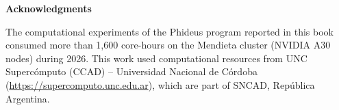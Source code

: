 \clearpage
\thispagestyle{empty}
\vspace*{0.24\textheight}

\begin{center}
\begin{minipage}{0.7\textwidth}
\setlength{\parindent}{0pt}
\setlength{\parskip}{0.95em}
\raggedright

{\Large\bfseries Acknowledgments\par}
\vspace{0.4em}
\frontcutdivider[0.09\textwidth]

\vspace{1.2em}

The computational experiments of the Phideus program reported in this book consumed more than 1,600 core-hours on the Mendieta cluster (NVIDIA A30 nodes) during 2026. This work used computational resources from UNC Superc\'omputo (CCAD) -- Universidad Nacional de C\'ordoba (\url{https://supercomputo.unc.edu.ar}), which are part of SNCAD, Rep\'ublica Argentina.

\end{minipage}
\end{center}
